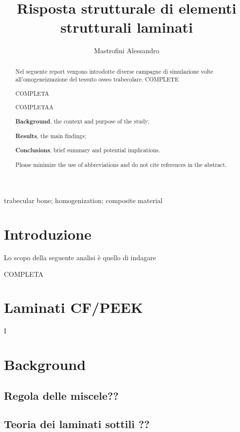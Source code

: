 \documentclass[a4paper,num-refs]{oup-contemporary}
\title{Risposta strutturale di elementi strutturali laminati}
\author{Mastrofini Alessandro}
\begin{document}
\begin{frontmatter}
\maketitle
\begin{abstract}

Nel seguente report vengono introdotte diverse campagne di simulazione volte all'omogeneizzazione del tessuto osseo trabecolare. 
COMPLETE

COMPLETA

COMPLETAA


 \textbf{Background}, the context and purpose of the study;
 
  \textbf{Results}, the main findings;
  
   \textbf{Conclusions}, brief summary and potential implications. 
   
   Please minimize the use of abbreviations and do not cite references in the abstract.
\end{abstract}

\begin{keywords}
trabecular bone; homogenization; composite material
\end{keywords}
\end{frontmatter}



\section{Introduzione}

Lo scopo della seguente analisi è quello di indagare

COMPLETA

\textcolor{blue}{\lipsum[1-2]}

\section{Laminati CF/PEEK}

I\textcolor{blue}{\lipsum[1-4]}


\section{Background}
\subsection{Regola delle miscele??}
\subsection{Teoria dei laminati sottili ??}
\end{document}

